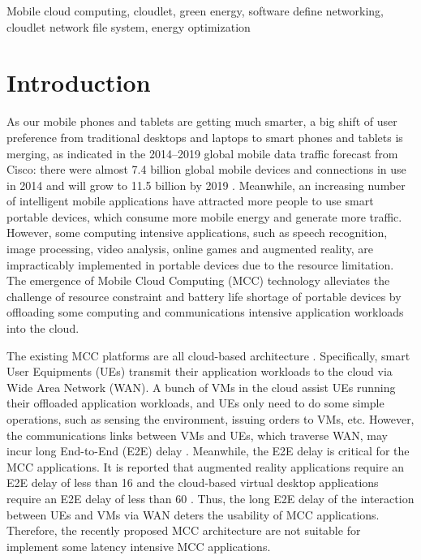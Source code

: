 \documentclass[journal,12pt,draftclsnofoot,onecolumn]{IEEEtran}
\begin{document}
\begin{IEEEkeywords}
Mobile cloud computing, cloudlet, green energy, software define networking, cloudlet network file system, energy optimization
\end{IEEEkeywords}
\IEEEpeerreviewmaketitle



\section{Introduction}
As our mobile phones and tablets are getting much smarter, a big shift of user preference from traditional desktops and laptops to smart phones and tablets is merging, as indicated in the 2014--2019 global mobile data traffic forecast from Cisco: there were almost 7.4 billion global mobile devices and connections in use in 2014 and will grow to 11.5 billion by 2019 \cite{1}. Meanwhile, an increasing number of intelligent mobile applications have attracted more people to use smart portable devices, which consume more mobile energy and generate more traffic. However, some computing intensive applications, such as speech recognition, image processing, video analysis, online games and augmented reality, are impracticably implemented in portable devices due to the resource limitation. The emergence of Mobile Cloud Computing (MCC) technology alleviates the challenge of resource constraint and battery life shortage of portable devices by offloading some computing and communications intensive application workloads into the cloud.

The existing MCC platforms are all cloud-based architecture \cite{1.1}. Specifically, smart User Equipments (UEs) transmit their application workloads to the cloud via Wide Area Network (WAN). A bunch of VMs in the cloud assist UEs running their offloaded application workloads, and UEs only need to do some simple operations, such as sensing the environment, issuing orders to VMs, etc. However, the communications links between VMs and UEs, which traverse WAN, may incur long End-to-End (E2E) delay \cite{2}. Meanwhile, the E2E delay is critical for the MCC applications. It is reported that augmented reality applications require an E2E delay of less than 16  \cite{2.1} and the cloud-based virtual desktop applications require an E2E delay of less than 60  \cite{2.2}. Thus, the long E2E delay of the interaction between UEs and VMs via WAN deters the usability of MCC applications. Therefore, the recently proposed MCC architecture are not suitable for implement some latency intensive MCC applications.
\end{document}
